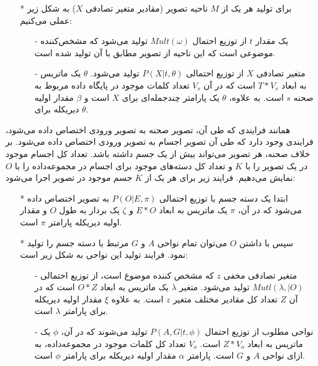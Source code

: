 \begin{enumerate}
\begin{itemize}
		\item[*] 
		برای تولید هر یک از $M$ ناحیه تصویر (مقادیر متغیر تصادفی $X$) به شکل زیر عملی می‌کنیم:
		\begin{itemize}
			\item[-]
			یک مقدار $t$ از توزیع احتمال $Mult(\omega)$ تولید می‌شود که مشخص‌کننده موضوعی است که این ناحیه از تصویر مطابق با آن تولید شده است.
			\item[-]
			متغیر تصادفی $X$ از توزیع احتمالی 
			$P(X|t,\theta)$ تولید می‌شود.
			$\theta$ یک ماتریس به ابعاد
			$T * V_s$ است که در آن
			$V_s$ تعداد کلمات موجود در پایگاه داده مربوط به صحنه $s$  است.
			به علاوه، $\theta$ یک پارامتر چندجمله‌ای برای $X$ است و $\beta$ مقدار اولیه دیریکله برای $\theta$.
		\end{itemize}
	\end{itemize}
	
	همانند فرایندی که طی آن، تصویر صحنه به تصویر ورودی اختصاص داده می‌شود، فرایندی وجود دارد که طی آن تصویر اجسام به تصویر ورودی اختصاص داده می‌شود. بر خلاف صحنه، هر تصویر می‌تواند بیش از یک جسم داشته باشد. تعداد کل اجسام موجود در یک تصویر را با $K$ و تعداد کل دسته‌های موجود برای اجسام در مجموعه‌داده را با $O$ نمایش می‌دهیم. فرایند زیر برای هر یک از $K$ جسم موجود در تصویر اجرا می‌شود:
	
	\begin{itemize}
		\item[*]
		ابتدا یک دسته جسم با توزیع احتمالی  
		$P(O|E, \pi)$
		به تصویر اختصاص داده می‌شود که در آن، $\pi$ یک ماتریس به ابعاد $E * O$ و $\zeta$ یک بردار به طول $O$ و مقدار اولیه دیریکله پارامتر $\pi$ است.
		\item[*]
		سپس با داشتن $O$ می‌توان تمام نواحی $A$ و $G$ مرتبط با دسته جسم را تولید نمود. فرایند تولید این نواحی به شکل زیر است:
		\begin{itemize}
			\item[-]
			متغیر تصادفی مخفی $z$ که مشخص کننده موضوع است، از توزیع احتمالی $Mutl(\lambda,|O)$ تولید می‌شود. متغیر $\lambda$ یک ماتریس به ابعاد $O * Z$ است که در آن  $Z$ تعداد کل مقادیر مختلف متغیر $z$ است. به علاوه $\xi$ مقدار اولیه دیریکله برای پارامتر $\lambda$ است.
			\item[-]
			نواحی مطلوب از توزیع احتمال $P(A,G|t, \phi)$ تولید می‌شوند که در آن، $\phi$ یک ماتریس به ابعاد $Z * V_o$ است. $V_o$ تعداد کل کلمات موجود در مجموعه‌داده، به ازای نواحی $A$ و $G$ است. پارامتر $\alpha$ مقدار اولیه دیریکله برای پارامتر $\phi$
			است. 	
		\end{itemize}
	\end{itemize}
	

\end{enumerate}
